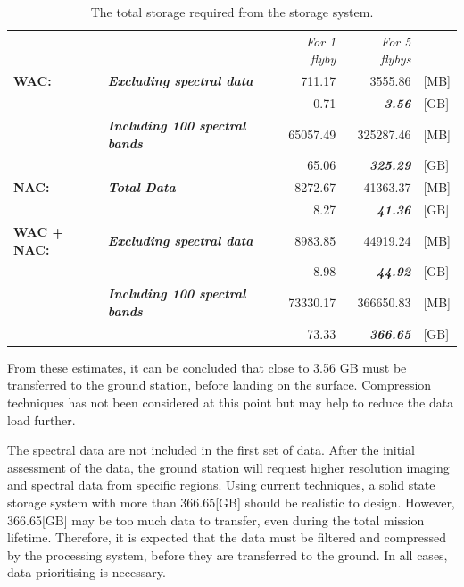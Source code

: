 \begin{table}[h!]
  \centering
\begin{tabular}{ll|r|r|l}
      &       & \textit{For 1 flyby} & \multicolumn{1}{r}{\textit{For 5 flybys}} &  \bigstrut[b]\\
\cline{1-4}\textbf{WAC:} & \multicolumn{1}{l|}{\textit{\textbf{Excluding spectral data}}} & 711.17 & 3555.86 & [MB] \bigstrut[t]\\
      & \multicolumn{1}{l|}{} & 0.71  & \textit{\textbf{3.56}} & [GB] \\
      & \multicolumn{1}{l|}{\textit{\textbf{Including 100 spectral bands}}} & 65057.49 & 325287.46 & [MB] \\
      & \multicolumn{1}{l|}{} & 65.06 & \textit{\textbf{325.29}} & [GB] \bigstrut[b]\\
\cline{1-4}\textbf{NAC:} & \multicolumn{1}{l|}{\textit{\textbf{Total Data}}} & 8272.67 & 41363.37 & [MB] \bigstrut[t]\\
      & \multicolumn{1}{l|}{} & 8.27  & \textit{\textbf{41.36}} & [GB] \bigstrut[b]\\
\hline
\textbf{WAC + NAC:} & \multicolumn{1}{l|}{\textit{\textbf{Excluding spectral data}}} & 8983.85 & 44919.24 & [MB] \bigstrut[t]\\
      & \multicolumn{1}{l|}{} & 8.98  & \textit{\textbf{44.92}} & [GB] \\
      & \multicolumn{1}{l|}{\textit{\textbf{Including 100 spectral bands}}} & 73330.17 & 366650.83 & [MB] \\
      & \multicolumn{1}{l|}{} & 73.33 & \textit{\textbf{366.65}} & [GB] \\
\end{tabular}%
\caption{The total storage required from the storage system.}
  \label{tab:data_rate_storage_requirements_final_5}%
\end{table}%

From these estimates, it can be concluded that close to 3.56 GB must be transferred to the ground station, before landing on the surface. Compression techniques has not been considered at this point but may help to reduce the data load further. 

The spectral data are not included in the first set of data. After the initial assessment of the data, the ground station will request higher resolution imaging and spectral data from specific regions. Using current techniques, a solid state storage system with more than 366.65[GB] should be realistic to design. However, 366.65[GB] may be too much data to transfer, even during the total mission lifetime. Therefore, it is expected that the data must be filtered and compressed by the processing system, before they are transferred to the ground. In all cases, data prioritising is necessary.

